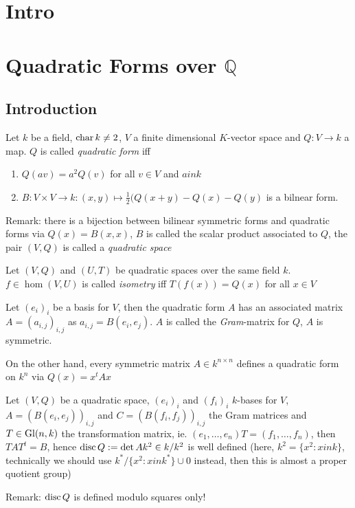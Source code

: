 \chapter{Intro}
\chapter{Quadratic Forms over $\mathbb Q$}
\section{Introduction}

\begin{definition}
Let $k$ be a field, $\mathop{\rm char}\nolimits k\ne 2$, $V$ a finite dimensional $K$-vector space and
$Q: V\to k$ a map. $Q$ is called {\em quadratic form} iff
\begin{enumerate}
\item $Q(av) = a^2Q(v)$ for all $v\in V$ and $a in k$
\item $B: V\times V \to k: (x,y) \mapsto \frac 1 2(Q(x+y) - Q(x)-Q(y)$
  is a bilnear form.
\end{enumerate}
\end{definition}
Remark: there is a bijection between bilinear symmetric forms and quadratic
forms via $Q(x) = B(x,x)$, $B$ is called the scalar product associated to 
$Q$, the pair $(V, Q)$ is called a {\em quadratic space}

\begin{definition}
Let $(V, Q)$ and $(U, T)$ be quadratic spaces over the same field $k$.
$f\in \hom(V, U)$ is called {\em isometry} iff $T(f(x)) = Q(x)$ for all $x\in V$
\end{definition}
\begin{remark}
Let $(e_i)_i$ be a basis for $V$, then the quadratic form $A$ has an
associated matrix $A = (a_{i,j})_{i,j}$ as $a_{i,j} = B(e_i, e_j)$.
$A$ is called the {\em Gram}-matrix for $Q$, $A$ is symmetric.

On the other hand, every symmetric matrix $A\in k^{n\times n}$ defines
a quadratic form on $k^n$ via $Q(x) = x^t A x$
\end{remark}

\begin{lemma}
Let $(V, Q)$ be a quadratic space, $(e_i)_i$ and $(f_i)_i$ $k$-bases
for $V$, $A = (B(e_i, e_j))_{i,j}$ and $C = (B(f_i, f_j))_{i,j}$ the
Gram matrices and $T\in \mathop{\rm Gl}\nolimits(n, k)$ the transformation matrix, ie.
$(e_1, \ldots, e_n)T = (f_1, \ldots, f_n)$, then
$TAT^t = B$, hence $\mathop{\rm disc}\nolimits Q := \det A k^2\in k/k^2$ is
well defined (here, $k^2 = \{x^2: x in k\}$, technically we should use
$k^*/\{x^2 : x in k^*\} \cup 0$ instead, then this is almost a proper
quotient group)
\end{lemma}
Remark: $\mathop{\rm disc}\nolimits Q$ is defined modulo squares only!

